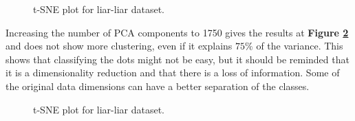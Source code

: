 \begin{figure}[h]
  \centering
  \caption{t-SNE plot for liar-liar dataset.}
  \label{fig:data_explo:tsne1}
\end{figure}
Increasing the number of PCA components to 1750 gives the results at \textbf{Figure \ref{fig:data_explo:tsne2}} and does not show more clustering, even if it explains $75\%$ of the variance. This shows that classifying the dots might not be easy, but it should be reminded that it is a dimensionality reduction and that there is a loss of information. Some of the original data dimensions can have a better separation of the classes. \\
\begin{figure}[h]
  \centering
  \caption{t-SNE plot for liar-liar dataset.}
  \label{fig:data_explo:tsne2}
\end{figure}
